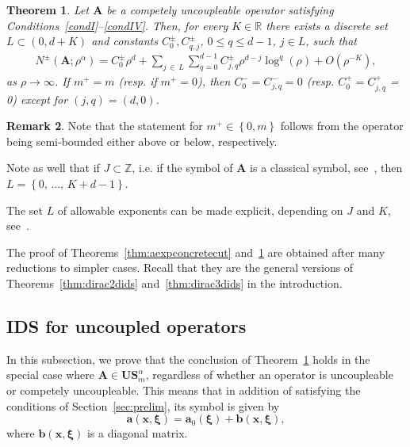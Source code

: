 \documentclass[10pt]{amsart}
\newtheorem{theo}{Theorem}[section]
\theoremstyle{definition}\newtheorem{defi}[theo]{Definition}\newtheorem{rema}[theo]{Remark}\newtheorem{exam}[theo]{Example}\newtheorem{nota}[theo]{Notation}
\newcommand{\R}{\mathbb R}
\newcommand{\Z}{\mathbb Z}
\newcommand{\bxi}{\boldsymbol \xi}
\newcommand{\ba}{\mathbf a}
\newcommand{\BA}{\mathbf A}
\newcommand{\BS}{\mathbf S}
\newcommand{\BU}{\mathbf U}
\newcommand{\bx}{\mathbf x}
\newcommand{\bbb}{\mathbf b}
\newcommand{\pd}{uncoupleable}
\newcommand{\mpu}{competely uncoupleable}
\newcommand{\bigo}[1]{O\left(#1 \right)}
\newcommand{\set}[1]{\left\{ #1 \right\}}
\begin{document}
\begin{theo} \label{thm:aexpconcrete}
Let $\BA$ be a \mpu{} operator satisfying Conditions~\ref{condI}--\ref{condIV}. Then, for every $K \in \R$ there exists a discrete set $L \subset (0,d+K)$ and constants $C_0^\pm, C_{q,j}^\pm$, $0 \le q \le d-1$, $j \in L$, such that
\begin{equation}
\begin{aligned}
N^\pm\left(\BA; \rho^\alpha \right) = C_0^\pm \rho^d +
\sum_{j\,\in\,L}\sum_{q =0}^{d-1} C_{j,q}^\pm \rho^{d-j} \log^q(\rho) + \bigo{\rho^{-K}},
\end{aligned}\label{eq:asymptoticsconcrete}
\end{equation}
as $\rho \to \infty$. If $m^+ = m$ (resp. if $m^+ = 0$), then $C_0^- = C^-_{j,q} = 0$ (resp. $C_0^+ = C^+_{j,q}$ = 0) except for $(j,q) = (d,0)$.
\end{theo}

\begin{rema}
Note that the statement for $m^+ \in \set{0,m}$ follows from the operator being semi-bounded either above or below, respectively.

Note as well that if $J \subset \Z$, i.e. if the symbol of $\BA$ is a classical symbol, see~\cite[Chapter~7]{TaylorII}, then $L=
\set{0,\,\dotsc,\,K + d - 1}$.

The set $L$ of allowable exponents can be made explicit, depending on $J$ and $K$, see~\cite[Remark~2.7]{MorParSht2014}.
\end{rema}

The proof of Theorems~\ref{thm:aexpconcretecut} and~\ref{thm:aexpconcrete} are obtained after many reductions to simpler cases. Recall that they are the general versions of Theorems~\ref{thm:dirac2dids} and~\ref{thm:dirac3dids} in the introduction.

\subsection{IDS for uncoupled operators} \label{sec:uncoupled}

In this subsection, we prove that the conclusion of Theorem~\ref{thm:aexpconcrete} holds in the special case where $\BA \in \BU\BS_m^\alpha$, regardless of whether an operator is \pd{} or \mpu{}. This means that in addition of satisfying the conditions of Section~\ref{sec:prelim}, its symbol is given by
\begin{equation}\label{eq:modeldmapo}
\ba(\bx,\bxi) = \ba_0(\bxi) + \bbb(\bx,\bxi),
\end{equation}
where $\bbb(\bx,\bxi)$ is a diagonal matrix.
\end{document}
